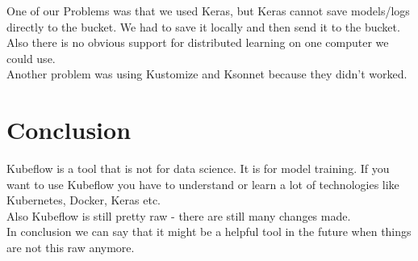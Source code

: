 \documentclass[12pt,a4paper]{scrartcl}		%
\begin{document}
\noindent One of our Problems was that we used Keras, but Keras cannot save models/logs directly to the bucket. We had to save it locally and then send it to the bucket. \\
Also there is no obvious support for distributed learning on one computer we could use. \\
Another problem was using Kustomize and Ksonnet because they didn't worked.

\section{Conclusion}

\noindent Kubeflow is a tool that is not for data science. It is for model training. 
If you want to use Kubeflow you have to understand or learn a lot of technologies like Kubernetes, Docker, Keras etc. \\
Also Kubeflow is still pretty raw - there are still many changes made. \\
In conclusion we can say that it might be a helpful tool in the future when things are not this raw anymore. 
\end{document}
